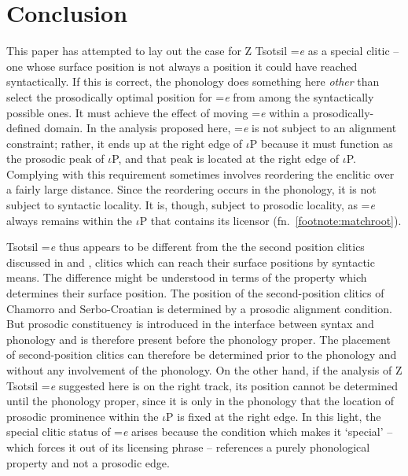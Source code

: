 \documentclass[output=paper,
modfonts
]{LSP/langsci}
\begin{document}
\section{Conclusion}
This paper has attempted to lay out the case for Z Tsotsil =\emph{e} as a special clitic  --  
one whose surface position is not always a position it could have reached syntactically. If this is correct, the phonology does something here \emph{other} than select the prosodically optimal position for =\emph{e} from among the syntactically possible ones. It must achieve the effect of moving =\emph{e} within a prosodically-defined domain. In the analysis proposed here, =\emph{e} is not subject to an alignment constraint; rather, it ends up at the right edge of $\iota$P because it must function as the prosodic peak of $\iota$P, and that peak is located at the right edge of $\iota$P. Complying with this requirement sometimes involves reordering the enclitic over a fairly large distance. Since the reordering occurs in the phonology, it is not subject to syntactic locality. It is, though, subject to prosodic locality, as =\emph{e} always remains within the $\iota$P  that contains its licensor 
(fn.~\ref{footnote:matchroot}). 

Tsotsil =\emph{e} thus appears to be different from the the second position clitics discussed in \citet{boskovic2000} and \citet{otero2011}, clitics which can reach their surface positions by syntactic means. The difference might be understood in terms of the property which determines their surface position. The position of the second-position clitics of Chamorro and Serbo-Croatian is determined by a prosodic alignment condition. But prosodic constituency is introduced in the interface between syntax and phonology and is therefore present before the phonology proper.  The placement of second-position clitics can therefore be determined prior to the phonology and without any involvement of the phonology.  On the other hand, if the analysis of Z Tsotsil =\emph{e} suggested here is on the right track, its position  cannot be determined until the phonology proper, since it is only in the phonology that the location of prosodic prominence within the $\iota$P is fixed at the right edge. In this light, the special clitic status of =\emph{e} arises because the condition which makes it `special'  --  which forces it out of its licensing phrase  --  references a purely phonological property and not a prosodic edge.  \\
\end{document}
